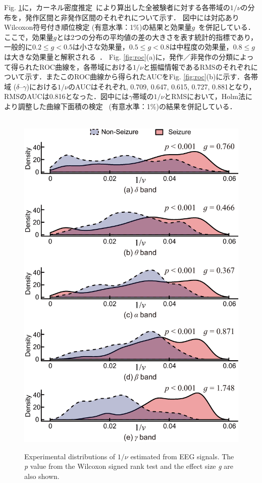 \documentclass[journal]{IEEEtran}
\begin{document}
Fig. \ref{fig:dens}に，カーネル密度推定~\cite{Parzen1962}により算出した全被験者に対する各帯域の$1/\nu$の分布を，発作区間と非発作区間のそれぞれについて示す．
図中には対応ありWilcoxon符号付き順位検定 (有意水準：1\%)の結果と効果量$g$~\cite{Hedges1981}を併記している．
ここで，効果量$g$とは2つの分布の平均値の差の大きさを表す統計的指標であり，一般的に$0.2 \leq g < 0.5$は小さな効果量，$0.5 \leq g < 0.8$は中程度の効果量，$0.8 \leq g$は大きな効果量と解釈される~\cite{Cohen2013}．
Fig. \ref{fig:roc}(a)に，発作／非発作の分類によって得られたROC曲線を，各帯域における$1/\nu$と振幅情報であるRMSのそれぞれについて示す．またこのROC曲線から得られたAUCをFig. \ref{fig:roc}(b)に示す．各帯域 ($\delta$--$\gamma$)における$1/\nu$のAUCはそれぞれ, 0.709, 0.647, 0.615, 0.727, 0.881となり，RMSのAUCは0.816となった．図中には$\gamma$帯域の$1/\nu$とRMSにおいて，Holm法により調整した曲線下面積の検定~\cite{Delong1988} (有意水準：1\%)の結果を併記している．




\begin{figure}[!t]　%
\centering
\includegraphics[width=1.0\hsize]{figure/dens_test_20_ver2.eps}
\caption{Experimental distributions of $1/\nu$ estimated from EEG signals. The \textit{p} value from the Wilcoxon signed rank test and the effect size \textit{g} are also shown. }
\label{fig:dens}
\end{figure}
\end{document}
